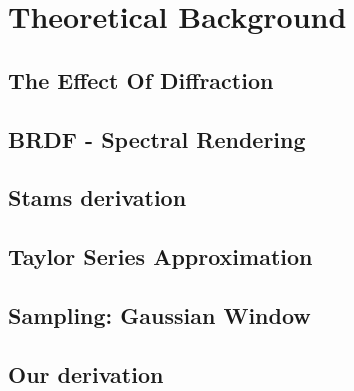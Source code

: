 \section{Theoretical Background}
\subsection{The Effect Of Diffraction}
\subsection{BRDF - Spectral Rendering}
\subsection{Stams derivation}
\subsection{Taylor Series Approximation}
\subsection{Sampling: Gaussian Window}
\subsection{Our derivation}
